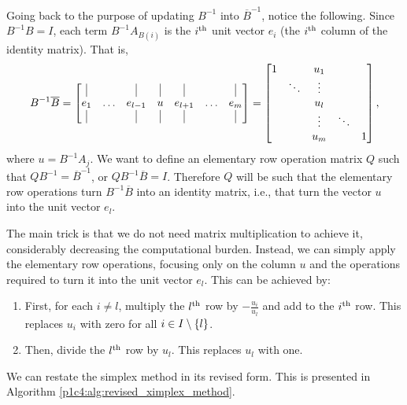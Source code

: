 Going back to the purpose of updating $B^{-1}$ into $\overline{B}^{-1}$,  notice the following. Since $B^{-1}B = I$, each term $B^{-1}A_{B(i)}$ is the $i^\text{th}$ unit vector $e_i$ (the $i^\text{th}$ column of the identity matrix). That is, 
%
\begin{equation*}
	B^{-1}\overline{B} = \begin{bmatrix} \vline & & \vline & \vline & \vline & & \vline \\
		e_1 & \dots & e_{l-1} & u & e_{l+1} & \dots & e_m \\
		 \vline & & \vline & \vline & \vline & & \vline								
	\end{bmatrix} = \begin{bmatrix} 1 & & u_1 & & \\ & \ddots & \vdots &  & \\ & & u_l & & \\ & & \vdots & \ddots & \\
	& & u_m & & 1 
	 	\end{bmatrix},
\end{equation*}
%
where $u = B^{-1}A_j$. We want to define an elementary row operation matrix $Q$ such that $QB^{-1} = \overline{B}^{-1}$, or $QB^{-1}\overline{B} = I$. Therefore $Q$ will be such that the elementary row operations turn $B^{-1}\overline{B}$ into an identity matrix, i.e., that turn the vector $u$ into the unit vector $e_l$.

The main trick is that we do not need matrix multiplication to achieve it, considerably decreasing the computational burden. Instead, we can simply apply the elementary row operations, focusing only on the column $u$ and the operations required to turn it into the unit vector $e_l$. This can be achieved by:

\begin{enumerate}
	\item First, for each $i \neq l$, multiply the $l^\text{th}$ row by $-\frac{u_i}{u_l}$ and add to the $i^\text{th}$ row. This replaces $u_i$ with zero for all $i \in I \setminus \left\{ l \right \}$.
	\item Then, divide the $l^\text{th}$ row by $u_l$. This replaces $u_l$ with one.
\end{enumerate}

We can restate the simplex method in its revised form. This is presented in Algorithm \ref{p1c4:alg:revised_ximplex_method}.

